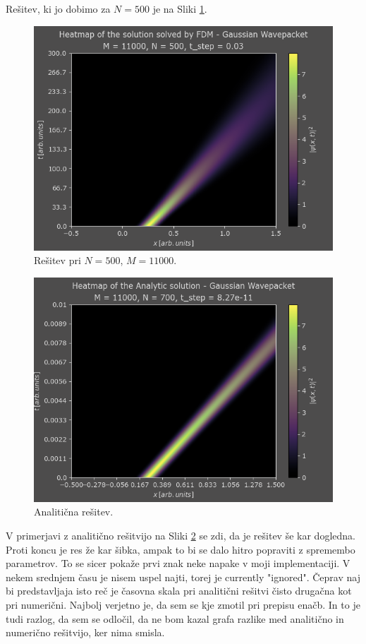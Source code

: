 \documentclass[a4paper]{article}
\begin{document}
Rešitev, ki jo dobimo za $N=500$ je na Sliki \ref{fig:gaussian_org}.

\begin{figure}[H]
    \centering
    \includegraphics[width=\textwidth]{./images/case2_N500_expanded.png}
    \caption{Rešitev pri $N=500$, $M=11000$.}
    \label{fig:gaussian_org}
\end{figure}

\begin{figure}
    \centering
    \includegraphics[width=\textwidth]{./images/case2_analytic.png}
    \caption{Analitična rešitev.}
    \label{fig:gaussian_analytic}
\end{figure}

V primerjavi z analitično rešitvijo na Sliki \ref{fig:gaussian_analytic} se zdi, da je rešitev
še kar dogledna. Proti koncu je res že kar šibka, ampak to bi se dalo hitro popraviti z spremembo
parametrov. To se sicer pokaže prvi znak neke napake v moji implementaciji. V nekem srednjem času
je nisem uspel najti, torej je currently "ignored". Čeprav naj bi predstavljaja isto reč je 
časovna skala pri analitični rešitvi čisto drugačna kot pri numerični. Najbolj verjetno je, da sem
se kje zmotil pri prepisu enačb. In to je tudi razlog, da sem se odločil, da ne bom kazal grafa
razlike med analitično in numerično rešitvijo, ker nima smisla. \\
\end{document}
